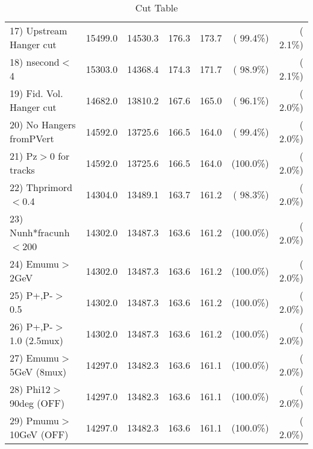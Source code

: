 \begin{table}[h!]
\begin{tabular}{||l||r|r|r|r|r|r||}
 17) Upstream Hanger cut  &      15499.0 &      14530.3 &        176.3 &        173.7 & ( 99.4\%) & (  2.1\%) \\
 18) nsecond$<$4          &      15303.0 &      14368.4 &        174.3 &        171.7 & ( 98.9\%) & (  2.1\%) \\
 19) Fid. Vol. Hanger cut &      14682.0 &      13810.2 &        167.6 &        165.0 & ( 96.1\%) & (  2.0\%) \\
 20) No Hangers fromPVert &      14592.0 &      13725.6 &        166.5 &        164.0 & ( 99.4\%) & (  2.0\%) \\
 21) Pz$>$0 for tracks    &      14592.0 &      13725.6 &        166.5 &        164.0 & (100.0\%) & (  2.0\%) \\
 22) Thprimord$<$0.4      &      14304.0 &      13489.1 &        163.7 &        161.2 & ( 98.3\%) & (  2.0\%) \\
 23) Nunh*fracunh$<$200   &      14302.0 &      13487.3 &        163.6 &        161.2 & (100.0\%) & (  2.0\%) \\
 24) Emumu$>$2GeV         &      14302.0 &      13487.3 &        163.6 &        161.2 & (100.0\%) & (  2.0\%) \\
 25) P+,P-$>$0.5          &      14302.0 &      13487.3 &        163.6 &        161.2 & (100.0\%) & (  2.0\%) \\
 26) P+,P-$>$1.0 (2.5mux) &      14302.0 &      13487.3 &        163.6 &        161.2 & (100.0\%) & (  2.0\%) \\
 27) Emumu$>$5GeV  (8mux) &      14297.0 &      13482.3 &        163.6 &        161.1 & (100.0\%) & (  2.0\%) \\
 28) Phi12$>$90deg  (OFF) &      14297.0 &      13482.3 &        163.6 &        161.1 & (100.0\%) & (  2.0\%) \\
 29) Pmumu$>$10GeV  (OFF) &      14297.0 &      13482.3 &        163.6 &        161.1 & (100.0\%) & (  2.0\%) \\
 \hline
 \hline
 \end{tabular}
 \caption{Cut Table           }
 \label{tab-cutcohjpsi-mumu_cohpip}
 \end{table}
